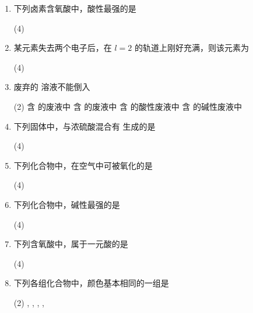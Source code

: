 \begin{enumerate}[label=\arabic*., itemsep=1.5ex]
    \item 下列卤素含氧酸中，酸性最强的是
    \begin{tasks}(4)
        \task {}
        \task {}
        \task {}
        \task {}
    \end{tasks}

    \item 某元素失去两个电子后，在 $l=2$ 的轨道上刚好充满，则该元素为
    \begin{tasks}(4)
        \task {}
        \task {}
        \task {}
        \task {}
    \end{tasks}

    \item 废弃的  溶液不能倒入
    \begin{tasks}(2)
        \task 含  的废液中
        \task 含  的废液中
        \task 含  的酸性废液中
        \task 含  的碱性废液中
    \end{tasks}

    \item 下列固体中，与浓硫酸混合有  生成的是
    \begin{tasks}(4)
        \task {}
        \task {}
        \task {}
        \task {}
    \end{tasks}

    \item 下列化合物中，在空气中可被氧化的是
    \begin{tasks}(4)
        \task {}
        \task {}
        \task {}
        \task {}
    \end{tasks}

    \item 下列化合物中，碱性最强的是
    \begin{tasks}(4)
        \task {}
        \task {}
        \task {}
        \task {}
    \end{tasks}

    \item 下列含氧酸中，属于一元酸的是
    \begin{tasks}(4)
        \task {}
        \task {}
        \task {}
        \task {}
    \end{tasks}

    \item 下列各组化合物中，颜色基本相同的一组是
    \begin{tasks}(2)
        \task {}, 
        \task {}, 
        \task {}, 
        \task {}, 
    \end{tasks}


\end{enumerate}
